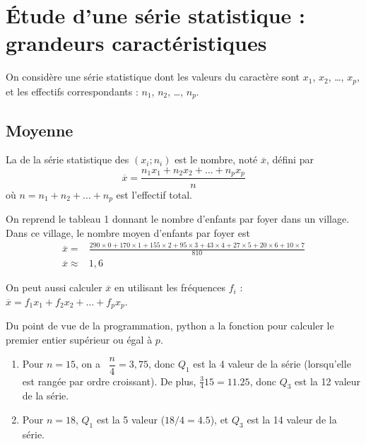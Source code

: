 \section{Étude d'une série statistique : grandeurs caractéristiques}

On considère une série statistique dont les valeurs du caractère sont
$x_1$, $x_2$, {\ldots}, $x_p$, et les effectifs correspondants :
$n_1$, $n_2$, {\ldots}, $n_p$.



\subsection{Moyenne}

\begin{definition}
    La  de la série statistique des $(x_i;n_i)$ est le
  nombre, noté $\overline{x}$, défini par
  \[
  \overline{x} =
  \frac{n_1x_1+n_2x_2+{\ldots}+n_px_p}{n} 
  \]
  où $n = n_1+n_2+{\ldots}+n_p$ est l'effectif total.

    
\end{definition}


\begin{example}
On reprend le tableau 1 donnant le nombre d'enfants par foyer
  dans un village. Dans ce village, le nombre moyen d'enfants par
  foyer est  
\begin{align*}
  \overline{x} = {} & 
  \frac{290\times0+170\times1+155\times2+95\times
    3+43\times 4+27\times 5+20\times 6+10\times 7}{810}
  \\[1ex]
  \overline{x} \approx {} & 1,6
\end{align*}
\end{example}



\begin{remark}
On peut aussi calculer $\overline{x}$ en utilisant les fréquences
  $f_i$ : \\[1ex]
  $ \overline{x} = f_1 x_1 + f_2x_2+{\ldots}+f_px_p $. 

    
\end{remark}

Du point de vue de la programmation, python a la fonction  pour calculer le premier entier supérieur ou égal à \( p\).



  \begin{example}
  \begin{enumerate}
  \item Pour $n=15$, on a \ $\dfrac{n}4 = 3,75$, donc $Q_1$ est la
    4\ieme{} valeur de la série (lorsqu'elle est rangée par ordre
    croissant). 
    De plus, \( \frac{ 3 }{ 4 }15=11.25\), donc $Q_3$ est la 12 valeur de la
    série. 
  \item Pour $n=18$, $Q_1$ est la 5 valeur (\( 18/4=4.5\)), et $Q_3$ est la 14 valeur de la série.
\end{enumerate}
      
  \end{example}


